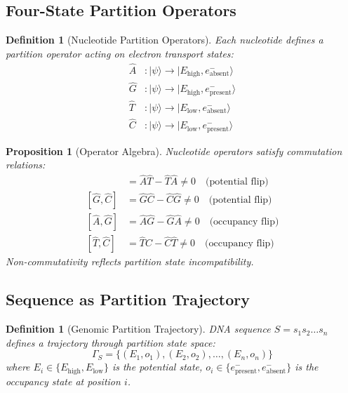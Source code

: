 \documentclass[11pt,a4paper]{article}
\newtheorem{definition}[theorem]{Definition}
\newtheorem{proposition}[theorem]{Proposition}
\theoremstyle{remark}
\begin{document}
\subsection{Four-State Partition Operators}

\begin{definition}[Nucleotide Partition Operators]
\label{def:nucleotide_operators}
Each nucleotide defines a partition operator acting on electron transport states:
\begin{align}
\hat{A} &: |\psi\rangle \to |E_{\text{high}}, e^-_{\text{absent}}\rangle \\
\hat{G} &: |\psi\rangle \to |E_{\text{high}}, e^-_{\text{present}}\rangle \\
\hat{T} &: |\psi\rangle \to |E_{\text{low}}, e^-_{\text{absent}}\rangle \\
\hat{C} &: |\psi\rangle \to |E_{\text{low}}, e^-_{\text{present}}\rangle
\end{align}
\end{definition}

\begin{proposition}[Operator Algebra]
\label{prop:operator_algebra}
Nucleotide operators satisfy commutation relations:
\begin{align}
[\hat{A}, \hat{T}] &= \hat{A}\hat{T} - \hat{T}\hat{A} \neq 0 \quad \text{(potential flip)} \\
[\hat{G}, \hat{C}] &= \hat{G}\hat{C} - \hat{C}\hat{G} \neq 0 \quad \text{(potential flip)} \\
[\hat{A}, \hat{G}] &= \hat{A}\hat{G} - \hat{G}\hat{A} \neq 0 \quad \text{(occupancy flip)} \\
[\hat{T}, \hat{C}] &= \hat{T}\hat{C} - \hat{C}\hat{T} \neq 0 \quad \text{(occupancy flip)}
\end{align}
Non-commutativity reflects partition state incompatibility.
\end{proposition}

\subsection{Sequence as Partition Trajectory}

\begin{definition}[Genomic Partition Trajectory]
\label{def:partition_trajectory}
DNA sequence $S = s_1 s_2 \ldots s_n$ defines a trajectory through partition state space:
\begin{equation}
\Gamma_S = \{(E_1, o_1), (E_2, o_2), \ldots, (E_n, o_n)\}
\end{equation}
where $E_i \in \{E_{\text{high}}, E_{\text{low}}\}$ is the potential state, $o_i \in \{e^-_{\text{present}}, e^-_{\text{absent}}\}$ is the occupancy state at position $i$.
\end{definition}
\end{document}
